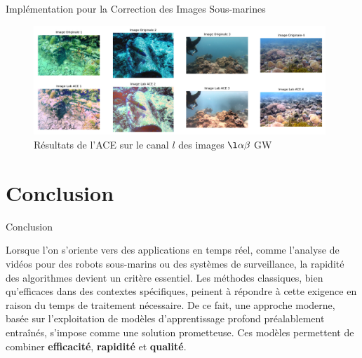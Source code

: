 \documentclass[8pt,a4paper]{beamer}
\numberwithin{figure}{section}
\begin{document}
\begin{frame}{Implémentation pour la Correction des Images Sous-marines}
\begin{figure}[h!]
\begin{center}
\includegraphics[width=11cm]{image003.png}
\end{center}
\label{figure4.4}
\caption{Résultats de l'ACE sur le canal $l$ des images $\l\alpha\beta\;$GW}
\end{figure} 
\end{frame}

\section{Conclusion}
\begin{frame}{Conclusion}
\par Lorsque l’on s’oriente vers des applications en temps réel, comme l’analyse de vidéos pour des robots sous-marins ou des systèmes de surveillance, la rapidité des algorithmes devient un critère essentiel. Les méthodes classiques, bien qu'efficaces dans des contextes spécifiques, peinent à répondre à cette exigence en raison du temps de traitement nécessaire. De ce fait, une approche moderne, basée sur l’exploitation de modèles d’apprentissage profond préalablement entraînés, s’impose comme une solution prometteuse. Ces modèles permettent de combiner \textbf{efficacité}, \textbf{rapidité} et \textbf{qualité}.
\end{frame}
\end{document}

